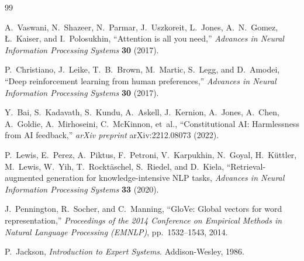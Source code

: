 \documentclass[11pt,a4paper]{article}
\theoremstyle{definition}
\begin{document}
\newpage
\begin{thebibliography}{99}

A.~Vaswani, N.~Shazeer, N.~Parmar, J.~Uszkoreit, L.~Jones, A.~N.~Gomez,
\L.~Kaiser, and I.~Polosukhin,
``Attention is all you need,''
\emph{Advances in Neural Information Processing Systems} \textbf{30} (2017).

P.~Christiano, J.~Leike, T.~B.~Brown, M.~Martic, S.~Legg, and D.~Amodei,
``Deep reinforcement learning from human preferences,''
\emph{Advances in Neural Information Processing Systems} \textbf{30} (2017).

Y.~Bai, S.~Kadavath, S.~Kundu, A.~Askell, J.~Kernion, A.~Jones, A.~Chen,
A.~Goldie, A.~Mirhoseini, C.~McKinnon, et~al.,
``Constitutional AI: Harmlessness from AI feedback,''
\emph{arXiv preprint} arXiv:2212.08073 (2022).

P.~Lewis, E.~Perez, A.~Piktus, F.~Petroni, V.~Karpukhin, N.~Goyal,
H.~K\"uttler, M.~Lewis, W.~Yih, T.~Rockt\"aschel, S.~Riedel, and D.~Kiela,
``Retrieval-augmented generation for knowledge-intensive NLP tasks,
\emph{Advances in Neural Information Processing Systems} \textbf{33} (2020).

J.~Pennington, R.~Socher, and C.~Manning,
``GloVe: Global vectors for word representation,''
\emph{Proceedings of the 2014 Conference on Empirical Methods in Natural
Language Processing (EMNLP)}, pp.\ 1532--1543, 2014.

P.~Jackson,
\emph{Introduction to Expert Systems}.
Addison-Wesley, 1986.

\end{thebibliography}
\end{document}

